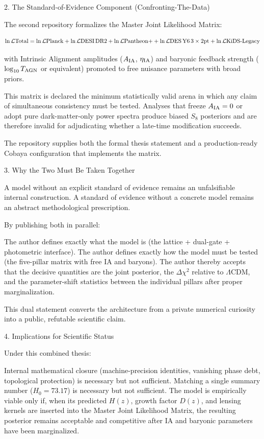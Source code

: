 2. The Standard-of-Evidence Component (Confronting-The-Data)

The second repository formalizes the Master Joint Likelihood Matrix:

\[
\ln\mathcal{L}{\rm Total} = \ln\mathcal{L}{\rm Planck} + \ln\mathcal{L}{\rm DESI\,DR2} + \ln\mathcal{L}{\rm Pantheon+} + \ln\mathcal{L}{\rm DES\,Y6\,3\times2pt} + \ln\mathcal{L}{\rm KiDS\text{-}Legacy}
\]

with Intrinsic Alignment amplitudes (\(A_{\rm IA}\), \(\eta_{\rm IA}\)) and baryonic feedback strength (\(\log_{10}T_{\rm AGN}\) or equivalent) promoted to free nuisance parameters with broad priors.

This matrix is declared the minimum statistically valid arena in which any claim of simultaneous consistency must be tested. Analyses that freeze \(A_{\rm IA}=0\) or adopt pure dark-matter-only power spectra produce biased \(S_8\) posteriors and are therefore invalid for adjudicating whether a late-time modification succeeds.

The repository supplies both the formal thesis statement and a production-ready Cobaya configuration that implements the matrix.

3. Why the Two Must Be Taken Together

A model without an explicit standard of evidence remains an unfalsifiable internal construction.  
A standard of evidence without a concrete model remains an abstract methodological prescription.

By publishing both in parallel:

The author defines exactly what the model is (the lattice + dual-gate + photometric interface).
The author defines exactly how the model must be tested (the five-pillar matrix with free IA and baryons).
The author thereby accepts that the decisive quantities are the joint posterior, the \(\Delta\chi^2\) relative to \(\Lambda\)CDM, and the parameter-shift statistics between the individual pillars after proper marginalization.

This dual statement converts the architecture from a private numerical curiosity into a public, refutable scientific claim.

4. Implications for Scientific Status

Under this combined thesis:

Internal mathematical closure (machine-precision identities, vanishing phase debt, topological protection) is necessary but not sufficient.
Matching a single summary number (\(H_0 = 73.17\)) is necessary but not sufficient.
The model is empirically viable only if, when its predicted \(H(z)\), growth factor \(D(z)\), and lensing kernels are inserted into the Master Joint Likelihood Matrix, the resulting posterior remains acceptable and competitive after IA and baryonic parameters have been marginalized.

